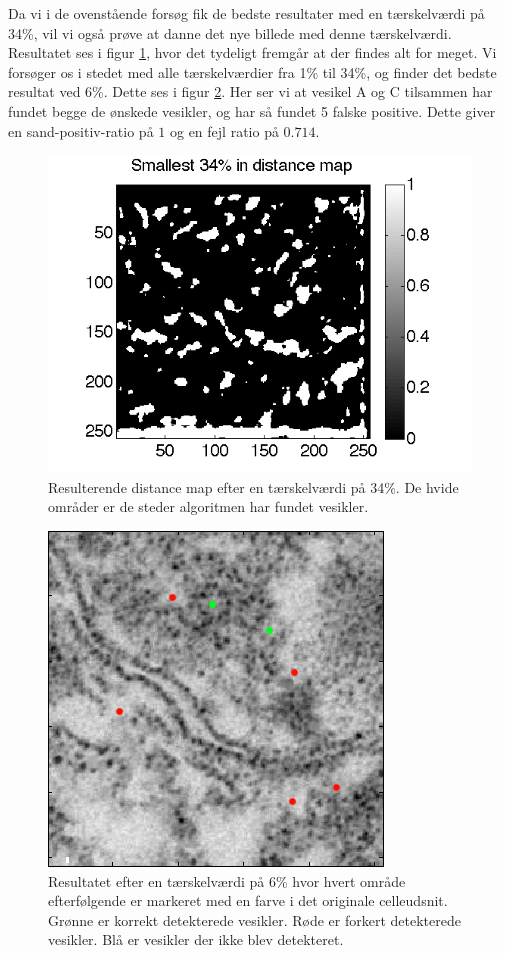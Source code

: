 Da vi i de ovenstående forsøg fik de bedste resultater med en tærskelværdi på 34\%, vil vi også prøve at danne det nye billede med denne tærskelværdi. Resultatet ses i figur \ref{fig:postmethod_conv_post_img3_th34}, hvor det tydeligt fremgår at der findes alt for meget. Vi forsøger os i stedet med alle tærskelværdier fra 1\% til 34\%, og finder det bedste resultat ved 6\%. Dette ses i figur \ref{fig:postmethod_conv_post_img3_th6}. Her ser vi at vesikel A og C tilsammen har fundet begge de ønskede vesikler, og har så fundet 5 falske positive. Dette giver en sand-positiv-ratio på $1$ og en fejl ratio på $0.714$.

\begin{figure}[H]
		\centering		\includegraphics[scale=0.65]{files/postmethod/img/ves1+2_img3_th-34.png}
	\caption{Resulterende distance map efter en tærskelværdi på 34\%. De hvide områder er de steder algoritmen har fundet vesikler.\label{fig:postmethod_conv_post_img3_th34}}
\end{figure}

\begin{figure}[H]
		\centering
	\includegraphics[scale=0.65]{files/postmethod/img/ves1+2_img3_th-6.png}
	\caption{Resultatet efter en tærskelværdi på 6\% hvor hvert område efterfølgende er markeret med en farve i det originale celleudsnit. Grønne er korrekt detekterede vesikler. Røde er forkert detekterede vesikler. Blå er vesikler der ikke blev detekteret.\label{fig:postmethod_conv_post_img3_th6}}
\end{figure}

